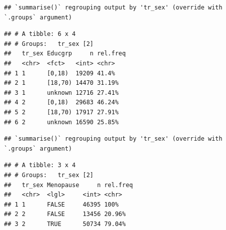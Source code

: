 \documentclass[
]{article}
\newenvironment{Shaded}{\begin{snugshade}}{\end{snugshade}}
\newcommand{\DataTypeTok}[1]{\textcolor[rgb]{0.13,0.29,0.53}{#1}}
\newcommand{\DecValTok}[1]{\textcolor[rgb]{0.00,0.00,0.81}{#1}}
\newcommand{\KeywordTok}[1]{\textcolor[rgb]{0.13,0.29,0.53}{\textbf{#1}}}
\newcommand{\NormalTok}[1]{#1}
\newcommand{\OperatorTok}[1]{\textcolor[rgb]{0.81,0.36,0.00}{\textbf{#1}}}
\newcommand{\OtherTok}[1]{\textcolor[rgb]{0.56,0.35,0.01}{#1}}
\newcommand{\StringTok}[1]{\textcolor[rgb]{0.31,0.60,0.02}{#1}}
\begin{document}
\begin{verbatim}
## `summarise()` regrouping output by 'tr_sex' (override with `.groups` argument)
\end{verbatim}

\begin{verbatim}
## # A tibble: 6 x 4
## # Groups:   tr_sex [2]
##   tr_sex Educgrp     n rel.freq
##   <chr>  <fct>   <int> <chr>   
## 1 1      [0,18)  19209 41.4%   
## 2 1      [18,70) 14470 31.19%  
## 3 1      unknown 12716 27.41%  
## 4 2      [0,18)  29683 46.24%  
## 5 2      [18,70) 17917 27.91%  
## 6 2      unknown 16590 25.85%
\end{verbatim}

\begin{Shaded}
\end{Shaded}

\begin{verbatim}
## `summarise()` regrouping output by 'tr_sex' (override with `.groups` argument)
\end{verbatim}

\begin{verbatim}
## # A tibble: 3 x 4
## # Groups:   tr_sex [2]
##   tr_sex Menopause     n rel.freq
##   <chr>  <lgl>     <int> <chr>   
## 1 1      FALSE     46395 100%    
## 2 2      FALSE     13456 20.96%  
## 3 2      TRUE      50734 79.04%
\end{verbatim}
\end{document}
